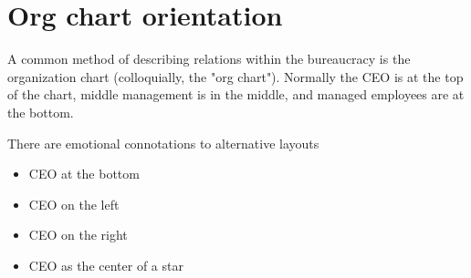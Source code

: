 \section{Org chart orientation
\label{org-chart-orientation}}
A common method of describing relations within the bureaucracy is the organization chart (colloquially, the "org chart"). Normally the CEO is at the top of the chart, middle management is in the middle, and managed employees are at the bottom. 

There are emotional connotations to alternative layouts
\begin{itemize}
\item CEO at the bottom
\item CEO on the left
\item CEO on the right
\item CEO as the center of a star
\end{itemize}



